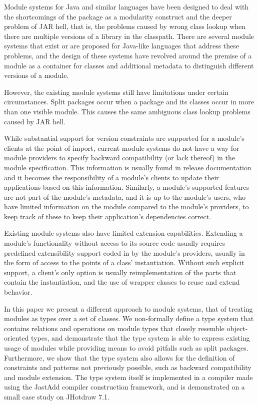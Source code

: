 Module systems for Java and similar languages have been designed 
to deal with the shortcomings of the package as a modularity construct
and the deeper problem of JAR hell, that is, the problems caused
by wrong class lookup when there are multiple versions of a library
in the classpath. There are several module systems that exist or are
proposed for Java-like languages \cite{javajars, OSGi4, netassemblies, JSR294, JSR277}
that address these problems, and the design of these systems have
revolved around the premise of a module as a container for classes
and additional metadata to distinguish different versions of a module.

However, the existing module systems still have limitations under 
certain circumstances. Split packages \cite{iJAMComments} occur when 
a package and its classes occur in more than one visible module. This
causes the same ambiguous class lookup problems caused by JAR hell.

While substantial support for version constraints are supported
for a module's clients at the point of import, current module 
systems do not have a way for module providers to specify backward 
compatibility (or lack thereof) in the module specification. 
This information is usually found in release documentation and 
it becomes the responsibility of a module's clients to update 
their applications based on this information. Similarly, a module's 
supported features are not part of the module's metadata, and it 
is up to the module's users, who have limited 
information on the module compared to the module's providers, to 
keep track of these to keep their application's dependencies correct.

Existing module systems also have limited extension capabilities. Extending
a module's functionality without access to its source code usually 
requires predefined extensibility support coded in by the module's 
providers, usually in the form of access to the points of a class' 
instantiation. Without such explicit support, a client's only option
is usually reimplementation of the parts that contain the instantiation, 
and the use of wrapper classes to reuse and extend behavior.

In this paper we present a different approach to module systems, 
that of treating modules as types over a set of classes. We non-formally
define a type system that contains relations and operations on module types 
that closely resemble object-oriented types, and demonstrate that the type
system is able to express existing usage of modules while providing means 
to avoid pitfalls such as split packages. 
Furthermore, we show that the type system also allows for the
definition of constraints and patterns not previously possible, such
as backward compatibility and module extension. The type system
itself is implemented in a compiler made using the JastAdd compiler construction
framework, and is demonstrated on a small case study on JHotdraw 7.1.
